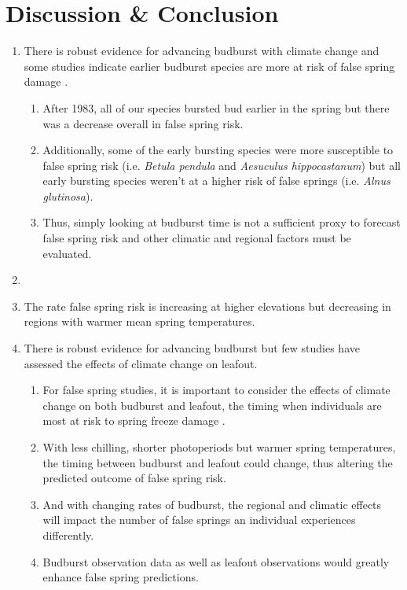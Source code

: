 \documentclass{article}\usepackage[]{graphicx}\usepackage[]{color}
\begin{document}
\section*{Discussion \& Conclusion}
\begin{enumerate}
\item There is robust evidence for advancing budburst with climate change \citep{Cleland2007, Wolkovich2012, IPCC2014} and some studies indicate earlier budburst species are more at risk of false spring damage \citep{Ma2018}.
  \begin{enumerate}
  \item After 1983, all of our species bursted bud earlier in the spring but there was a decrease overall in false spring risk.
  \item Additionally, some of the early bursting species were more susceptible to false spring risk (i.e. \textit{Betula pendula} and \textit{Aesuculus hippocastanum}) but all early bursting species weren't at a higher risk of false springs (i.e. \textit{Alnus glutinosa}). 
  \item Thus, simply looking at budburst time is not a sufficient proxy to forecast false spring risk and other climatic and regional factors must be evaluated.
  \end{enumerate}
 
\item 
\item The rate false spring risk is increasing at higher elevations but decreasing in regions with warmer mean spring temperatures. 


\item There is robust evidence for advancing budburst \citep{Cleland2007, Wolkovich2012, IPCC2014} but few studies have assessed the effects of climate change on leafout.
  \begin{enumerate}
  \item For false spring studies, it is important to consider the effects of climate change on both budburst and leafout, the timing when individuals are most at risk to spring freeze damage \citep{Lenz2016}.
  \item With less chilling, shorter photoperiods but warmer spring temperatures, the timing between budburst and leafout could change, thus altering the predicted outcome of false spring risk.
  \item And with changing rates of budburst, the regional and climatic effects will impact the number of false springs an individual experiences differently.
  \item Budburst observation data as well as leafout observations would greatly enhance false spring predictions.



  
  
  
  
  
  
  \end{enumerate}
\end{enumerate}
\end{document}
